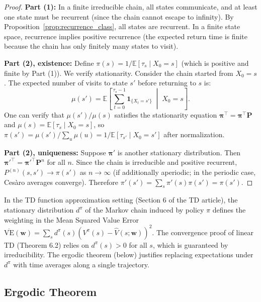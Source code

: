 \documentclass[11pt,a4paper]{article}
\theoremstyle{definition}
\theoremstyle{plain}
\theoremstyle{remark}
\newcommand{\E}{\mathbb{E}}
\newcommand{\indicator}{\mathbf{1}}
\begin{document}
\begin{proof}
\textbf{Part (1):} In a finite irreducible chain, all states communicate, and at least one state must be recurrent (since the chain cannot escape to infinity). By Proposition~\ref{prop:recurrence_class}, all states are recurrent. In a finite state space, recurrence implies positive recurrence (the expected return time is finite because the chain has only finitely many states to visit).

\textbf{Part (2), existence:} Define $\pi(s) = 1/\E[\tau_s \mid X_0 = s]$ (which is positive and finite by Part (1)). We verify stationarity. Consider the chain started from $X_0 = s$. The expected number of visits to state $s'$ before returning to $s$ is:
\begin{equation}
    \mu(s') = \E\!\left[\sum_{t=0}^{\tau_s - 1} \indicator_{\{X_t = s'\}} \;\middle|\; X_0 = s\right].
\end{equation}
One can verify that $\mu(s') / \mu(s)$ satisfies the stationarity equation $\boldsymbol{\pi}^\top = \boldsymbol{\pi}^\top \mathbf{P}$ and $\mu(s) = \E[\tau_s \mid X_0 = s]$, so $\pi(s') = \mu(s') / \sum_{u} \mu(u) = 1/\E[\tau_{s'} \mid X_0 = s']$ after normalization.

\textbf{Part (2), uniqueness:} Suppose $\boldsymbol{\pi}'$ is another stationary distribution. Then $\boldsymbol{\pi}'^\top = \boldsymbol{\pi}'^\top \mathbf{P}^n$ for all $n$. Since the chain is irreducible and positive recurrent, $P^{(n)}(s, s') \to \pi(s')$ as $n \to \infty$ (if additionally aperiodic; in the periodic case, Ces\`{a}ro averages converge). Therefore $\pi'(s') = \sum_s \pi'(s) \pi(s') = \pi(s')$.
\end{proof}

\begin{rlconnection}[Connection to RL]
In the TD function approximation setting (Section 6 of the TD article), the stationary distribution $d^\pi$ of the Markov chain induced by policy $\pi$ defines the weighting in the Mean Squared Value Error $\overline{\text{VE}}(\mathbf{w}) = \sum_s d^\pi(s)(V^\pi(s) - \hat{V}(s; \mathbf{w}))^2$. The convergence proof of linear TD (Theorem 6.2) relies on $d^\pi(s) > 0$ for all $s$, which is guaranteed by irreducibility. The ergodic theorem (below) justifies replacing expectations under $d^\pi$ with time averages along a single trajectory.
\end{rlconnection}

\subsection{Ergodic Theorem}
\label{subsec:ergodic}
\end{document}
